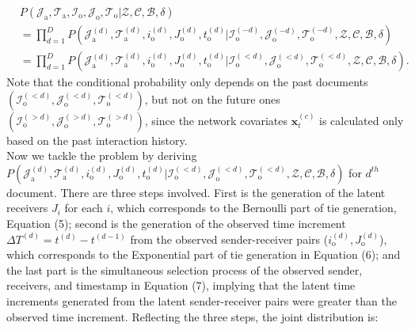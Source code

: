 \documentclass[a4paper]{article}
\begin{document}
 \begin{equation}
\begin{aligned}
&P(\mathcal{J}_{\mbox{a}}, \mathcal{T}_{\mbox{a}},\mathcal{I}_{\mbox{o}}, \mathcal{J}_{\mbox{o}}, \mathcal{T}_{\mbox{o}} |\mathcal{Z}, \mathcal{C}, \mathcal{B}, \delta)
\\& = \prod_{d=1}^D P(\mathcal{J}^{(d)}_{\mbox{a}}, \mathcal{T}^{(d)}_{\mbox{a}}, i^{(d)}_{\mbox{o}}, J^{(d)}_{\mbox{o}}, t^{(d)}_{\mbox{o}} |\mathcal{I}^{(-d)}_{\mbox{o}}, \mathcal{J}^{(-d)}_{\mbox{o}}, \mathcal{T}^{(-d)}_{\mbox{o}},\mathcal{Z}, \mathcal{C}, \mathcal{B}, \delta)
\\& = \prod_{d=1}^D P(\mathcal{J}^{(d)}_{\mbox{a}}, \mathcal{T}^{(d)}_{\mbox{a}}, i^{(d)}_{\mbox{o}}, J^{(d)}_{\mbox{o}}, t^{(d)}_{\mbox{o}} |\mathcal{I}^{(<d)}_{\mbox{o}}, \mathcal{J}^{(<d)}_{\mbox{o}}, \mathcal{T}^{(<d)}_{\mbox{o}},\mathcal{Z}, \mathcal{C}, \mathcal{B}, \delta).
\end{aligned}
 \end{equation}
 Note that the conditional probability only depends on the past documents $(\mathcal{I}^{(<d)}_{\mbox{o}}, \mathcal{J}^{(<d)}_{\mbox{o}}, \mathcal{T}^{(<d)}_{\mbox{o}})$, but not on the future ones $(\mathcal{I}^{(>d)}_{\mbox{o}}, \mathcal{J}^{(>d)}_{\mbox{o}}, \mathcal{T}^{(>d)}_{\mbox{o}})$, since the network covariates $\boldsymbol{x}_t^{(c)}$ is calculated only based on the past interaction history. \\ \newline
Now we tackle the problem by deriving $P(\mathcal{J}^{(d)}_{\mbox{a}}, \mathcal{T}^{(d)}_{\mbox{a}}, i^{(d)}_{\mbox{o}}, J^{(d)}_{\mbox{o}}, t^{(d)}_{\mbox{o}} |\mathcal{I}^{(<d)}_{\mbox{o}}, \mathcal{J}^{(<d)}_{\mbox{o}}, \mathcal{T}^{(<d)}_{\mbox{o}}, \mathcal{Z}, \mathcal{C}, \mathcal{B}, \delta)$ for $d^{th}$ document. There are three steps involved. First is the generation of the latent receivers $J_i$ for each $i$, which corresponds to the Bernoulli part of tie generation, Equation (5); second is the generation of the observed time increment $\Delta T^{(d)} = t^{(d)} - t^{(d-1)}$ from the observed sender-receiver pairs ($i^{(d)}_{\mbox{o}}, J^{(d)}_{\mbox{o}}$), which corresponds to the Exponential part of tie generation in Equation (6); and the last part is the simultaneous selection process of the observed sender, receivers, and timestamp in Equation (7), implying that the latent time increments generated from the latent sender-receiver pairs were greater than the observed time increment. Reflecting the three steps, the joint distribution is:\\
\end{document}
